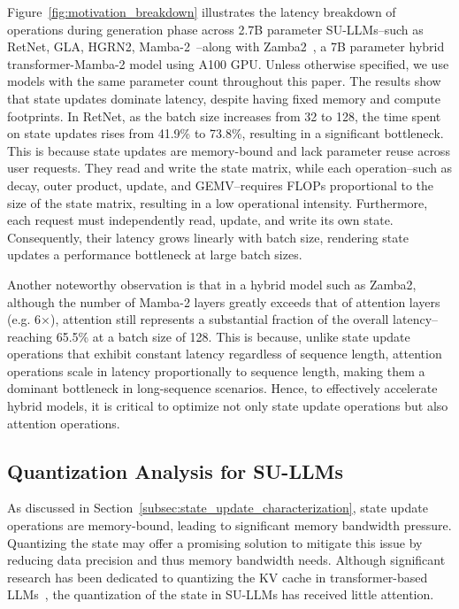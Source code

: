 %
%
Figure~\ref{fig:motivation_breakdown} illustrates the latency
breakdown of operations during generation phase across 2.7B parameter
SU-LLMs--such as RetNet, GLA, HGRN2, Mamba-2~\cite{retnet,
gated_linear_attention, hgrn2, mamba2}--along with
Zamba2~\cite{zamba2}, a 7B parameter hybrid transformer-Mamba-2 model
using A100 GPU.
%
Unless otherwise specified, we use models with the same parameter
count throughout this paper.
%
The results show that state updates dominate latency, despite having
fixed memory and compute footprints.
%
In RetNet, as the batch size increases from 32 to 128, the time spent
on state updates rises from 41.9\% to 73.8\%, resulting in a
significant bottleneck.
%
This is because state updates are memory-bound and lack parameter
reuse across user requests.
%
They read and write the state matrix, while each operation--such as
decay, outer product, update, and GEMV--requires FLOPs proportional
to the size of the state matrix, resulting in a low operational intensity.
%
Furthermore, each request must independently read, update, and write
its own state.
%
Consequently, their latency grows linearly with batch size, rendering
state updates a performance bottleneck at large batch sizes.
%

%
Another noteworthy observation is that in a hybrid model such as
Zamba2, although the number of Mamba-2 layers greatly exceeds that of
attention layers (e.g. 6$\times$), attention still represents a
substantial fraction of the overall latency--reaching 65.5\% at a
batch size of 128.
%
This is because, unlike state update operations that exhibit constant
latency regardless of sequence length, attention operations scale in
latency proportionally to sequence length, making them a dominant
bottleneck in long-sequence scenarios.
%
Hence, to effectively accelerate hybrid models, it is critical to
optimize not only state update operations but also attention operations.
%

\subsection{Quantization Analysis for SU-LLMs}
\label{subsec:challenges_quantization}
%
As discussed in Section~\ref{subsec:state_update_characterization},
state update operations are memory-bound, leading to significant
memory bandwidth pressure.
%
Quantizing the state may offer a promising solution to mitigate this
issue by reducing data precision and thus memory bandwidth needs.
%
Although significant research has been dedicated to quantizing the KV
cache in transformer-based LLMs~\cite{xiao2023smoothquant,
hooper2024kvquant, atom}, the quantization of the state in SU-LLMs
has received little attention.
%

